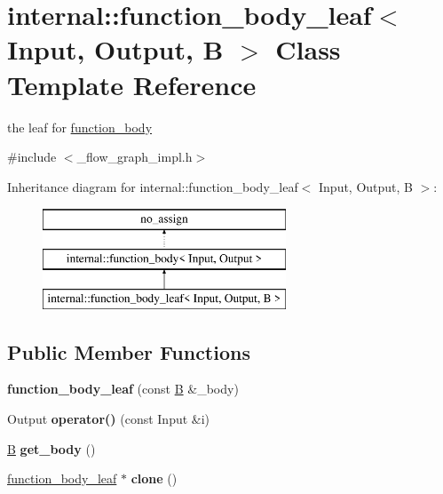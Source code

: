 \hypertarget{classinternal_1_1function__body__leaf}{}\section{internal\+:\+:function\+\_\+body\+\_\+leaf$<$ Input, Output, B $>$ Class Template Reference}
\label{classinternal_1_1function__body__leaf}


the leaf for \hyperlink{classinternal_1_1function__body}{function\+\_\+body}  




{\ttfamily \#include $<$\+\_\+flow\+\_\+graph\+\_\+impl.\+h$>$}

Inheritance diagram for internal\+:\+:function\+\_\+body\+\_\+leaf$<$ Input, Output, B $>$\+:\begin{figure}[H]
\begin{center}
\leavevmode
\includegraphics[height=3.000000cm]{classinternal_1_1function__body__leaf}
\end{center}
\end{figure}
\subsection*{Public Member Functions}
\begin{DoxyCompactItemize}
\item 
\hypertarget{classinternal_1_1function__body__leaf_a95a5d8b56e4044bbbd516594f83c81a7}{}{\bfseries function\+\_\+body\+\_\+leaf} (const \hyperlink{classB}{B} \&\+\_\+body)\label{classinternal_1_1function__body__leaf_a95a5d8b56e4044bbbd516594f83c81a7}

\item 
\hypertarget{classinternal_1_1function__body__leaf_aa1a80f5e51cc1fe3370ca221bf1b2d49}{}Output {\bfseries operator()} (const Input \&i)\label{classinternal_1_1function__body__leaf_aa1a80f5e51cc1fe3370ca221bf1b2d49}

\item 
\hypertarget{classinternal_1_1function__body__leaf_a833ee960f3eff8cd9bf6b4e7eab2ad1d}{}\hyperlink{classB}{B} {\bfseries get\+\_\+body} ()\label{classinternal_1_1function__body__leaf_a833ee960f3eff8cd9bf6b4e7eab2ad1d}

\item 
\hypertarget{classinternal_1_1function__body__leaf_af1eafa091017de971d27f0ee0441e0b9}{}\hyperlink{classinternal_1_1function__body__leaf}{function\+\_\+body\+\_\+leaf} $\ast$ {\bfseries clone} ()\label{classinternal_1_1function__body__leaf_af1eafa091017de971d27f0ee0441e0b9}

\end{DoxyCompactItemize}


